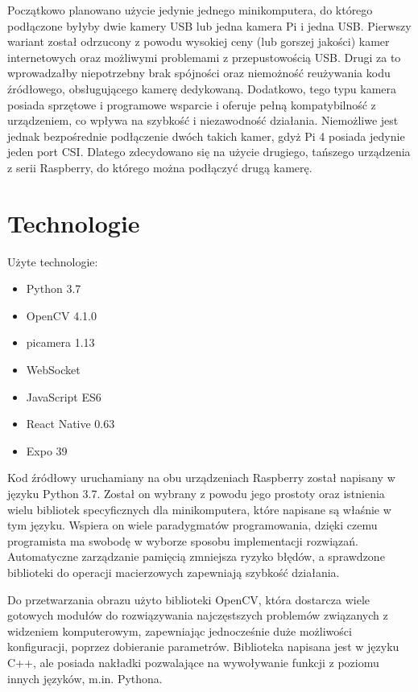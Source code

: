 Początkowo planowano użycie jedynie jednego minikomputera, do którego podłączone byłyby dwie kamery USB lub jedna kamera Pi i jedna USB. Pierwszy wariant został odrzucony z powodu wysokiej ceny (lub gorszej jakości) kamer internetowych oraz możliwymi problemami z przepustowością USB. Drugi za to wprowadzałby niepotrzebny brak spójności oraz niemożność reużywania kodu źródłowego, obsługującego kamerę dedykowaną. Dodatkowo, tego typu kamera posiada sprzętowe i programowe wsparcie i oferuje pełną kompatybilność z urządzeniem, co wpływa na szybkość i niezawodność działania. Niemożliwe jest jednak bezpośrednie podłączenie dwóch takich kamer, gdyż Pi 4 posiada jedynie jeden port CSI. Dlatego zdecydowano się na użycie drugiego, tańszego urządzenia z serii Raspberry, do którego można podłączyć drugą kamerę. 

\section{Technologie}
Użyte technologie:
\begin{itemize}
  \item Python 3.7
  \item OpenCV 4.1.0
  \item picamera 1.13
  \item WebSocket
  \item JavaScript ES6
  \item React Native 0.63
  \item Expo 39
\end{itemize}

Kod źródłowy uruchamiany na obu urządzeniach Raspberry został napisany w języku Python 3.7. Został on wybrany z powodu jego prostoty oraz istnienia wielu bibliotek specyficznych dla minikomputera, które napisane są właśnie w tym języku. Wspiera on wiele paradygmatów programowania, dzięki czemu programista ma swobodę w wyborze sposobu implementacji rozwiązań. Automatyczne zarządzanie pamięcią zmniejsza ryzyko błędów, a sprawdzone biblioteki do operacji macierzowych zapewniają szybkość działania.

Do przetwarzania obrazu użyto biblioteki OpenCV, która dostarcza wiele gotowych modułów do rozwiązywania najczęstszych problemów związanych z widzeniem komputerowym, zapewniając jednocześnie duże możliwości konfiguracji, poprzez dobieranie parametrów. Biblioteka napisana jest w języku C++, ale posiada nakładki pozwalające na wywoływanie funkcji z poziomu innych języków, m.in. Pythona.

